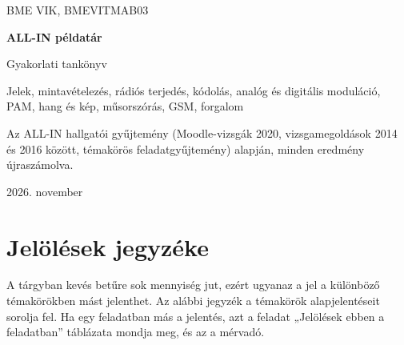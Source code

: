 

\frontmatter
\begin{titlepage}
\centering
\vspace*{30mm}
{\sffamily\large BME VIK, BMEVITMAB03\par}
\vspace{8mm}
{\sffamily\bfseries\Huge ALL-IN példatár\par}
\vspace{6mm}
{\sffamily\Large Gyakorlati tankönyv\par}
\vspace{6mm}
{\large Jelek, mintavételezés, rádiós terjedés, kódolás, analóg és digitális moduláció, PAM, hang és kép, műsorszórás, GSM, forgalom\par}
\vspace{14mm}
\vfill
{\small Az ALL-IN hallgatói gyűjtemény (Moodle-vizsgák 2020, vizsgamegoldások 2014 és 2016 között, témakörös feladatgyűjtemény) alapján, minden eredmény újraszámolva.\par}
\vspace{8mm}
{\small 2026. november\par}
\end{titlepage}

\tableofcontents
\mainmatter
\chapter*{Jelölések jegyzéke}
A tárgyban kevés betűre sok mennyiség jut, ezért ugyanaz a jel a különböző témakörökben mást jelenthet. Az alábbi jegyzék a témakörök alapjelentéseit sorolja fel. Ha egy feladatban más a jelentés, azt a feladat „Jelölések ebben a feladatban” táblázata mondja meg, és az a mérvadó.

